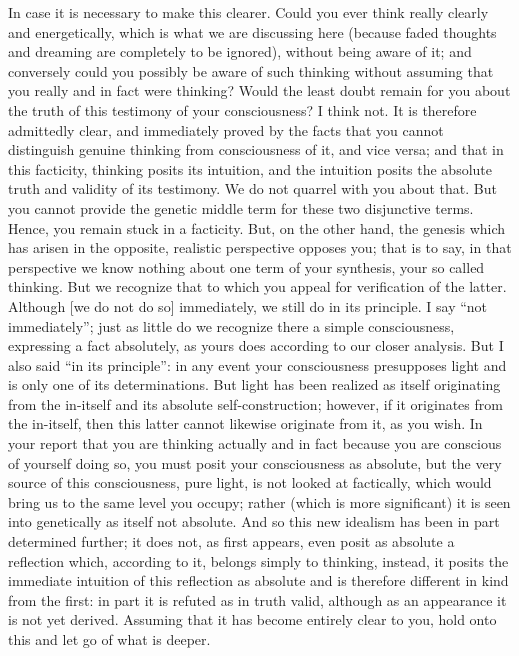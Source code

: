In case it is necessary to make this clearer.
Could you ever think really clearly and energetically,
which is what we are discussing here
(because faded thoughts and dreaming are
completely to be ignored),
without being aware of it;
and conversely could you possibly be
aware of such thinking without assuming
that you really and in fact were thinking?
Would the least doubt remain for you about the truth
of this testimony of your consciousness?
I think not.
It is therefore admittedly clear,
and immediately proved by the facts
that you cannot distinguish genuine thinking
from consciousness of it, and vice versa;
and that in this facticity, thinking posits its intuition,
and the intuition posits the absolute
truth and validity of its testimony.
We do not quarrel with you about that.
But you cannot provide the genetic middle term
for these two disjunctive terms.
Hence, you remain stuck in a facticity.
But, on the other hand, the genesis
which has arisen in the opposite,
realistic perspective opposes you;
that is to say, in that perspective we know nothing about
one term of your synthesis, your so called thinking.
But we recognize that to which you appeal
for verification of the latter.
Although [we do not do so] immediately,
we still do in its principle.
I say “not immediately”;
just as little do we recognize
there a simple consciousness,
expressing a fact absolutely,
as yours does according to our closer analysis.
But I also said “in its principle”:
in any event your consciousness presupposes light
and is only one of its determinations.
But light has been realized as itself originating from the in-itself
and its absolute self-construction;
however, if it originates from the in-itself,
then this latter cannot likewise originate from it, as you wish.
In your report that you are thinking actually and in fact
because you are conscious of yourself doing so,
you must posit your consciousness as absolute,
but the very source of this consciousness,
pure light, is not looked at factically,
which would bring us to the same level you occupy;
rather (which is more significant) it is
seen into genetically as itself not absolute.
And so this new idealism has been in part
determined further;
it does not, as first appears, even posit
as absolute a reflection which, according to it,
belongs simply to thinking, instead,
it posits the immediate intuition of this reflection as absolute
and is therefore different in kind from the first:
in part it is refuted as in truth valid,
although as an appearance it is not yet derived.
Assuming that it has become entirely clear to you,
hold onto this and let go of what is deeper.

